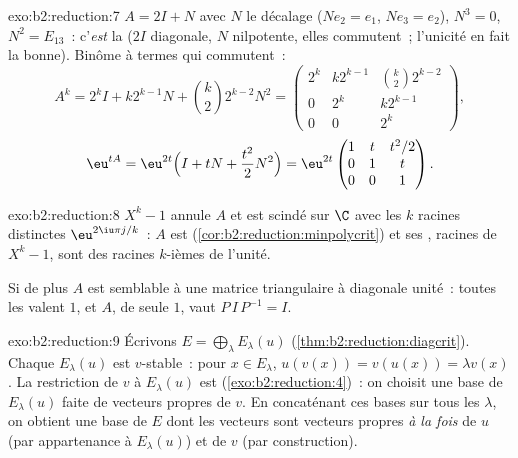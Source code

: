 \begin{solution}{exo:b2:reduction:7}
$A = 2I + N$ avec $N$ le décalage ($N e_2 = e_1$, $Ne_3 = e_2$),
$N^3 = 0$, $N^2 = E_{13}$~: c'\emph{est} la 
($2I$ diagonale, $N$ nilpotente, elles commutent~; l'unicité en fait
la bonne). Binôme à termes qui commutent~:
\[
A^k = 2^k I + k 2^{k-1} N + \binom k2 2^{k-2} N^2
= \begin{pmatrix}
2^k & k2^{k-1} & \binom k2 2^{k-2}\\
0 & 2^k & k2^{k-1}\\
0 & 0 & 2^k
\end{pmatrix},
\]
\[
\eu^{tA} = \eu^{2t}\Bigl(I + tN + \frac{t^2}{2}N^2\Bigr)
= \eu^{2t}\begin{pmatrix}
1 & t & t^2/2\\
0 & 1 & t\\
0 & 0 & 1
\end{pmatrix}.
\]
\end{solution}

\begin{solution}{exo:b2:reduction:8}
$X^k - 1$ annule $A$ et est scindé sur $\C$ avec les $k$ racines
distinctes $\eu^{2\iu\pi j/k}$~: $A$ est 
(\cref{cor:b2:reduction:minpolycrit}) et ses , racines
de $X^k - 1$, sont des racines $k$-ièmes de l'unité.

Si de plus $A$ est semblable à une matrice triangulaire à diagonale
unité~: toutes les  valent $1$, et $A$, 
de seule  $1$, vaut $P\,I\,P^{-1} = I$.
\end{solution}

\begin{solution}{exo:b2:reduction:9}
Écrivons $E = \bigoplus_\lambda E_\lambda(u)$
(\cref{thm:b2:reduction:diagcrit}). Chaque $E_\lambda(u)$ est
$v$-stable~: pour $x \in E_\lambda$, $u(v(x)) = v(u(x)) = \lambda
v(x)$. La restriction de $v$ à $E_\lambda(u)$ est 
(\cref{exo:b2:reduction:4})~: on choisit une base de $E_\lambda(u)$
faite de vecteurs propres de $v$. En concaténant ces bases sur tous
les $\lambda$, on obtient une base de $E$ dont les vecteurs sont
vecteurs propres \emph{à la fois} de $u$ (par appartenance à
$E_\lambda(u)$) et de $v$ (par construction).
\end{solution}

